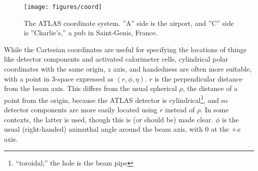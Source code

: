 \begin{figure}[!htbp]\captionsetup{justification=centering}
  \centering
  \texttt{[image: figures/coord]}
  \caption{The  ATLAS coordinate system.  ''A'' side is the airport, and ''C'' side is ''Charlie's,'' a pub in Saint-Genis, France.}
  \label{fig:acoord}
\end{figure}

While the Cartesian coordinates are useful for specifying the locations of things like detector components and activated calorimeter cells, cylindrical polar coordinates with the same origin, $z$ axis, and handedness are often more suitable, with a point in 3-space expressed as $\left(r,\phi,\eta\right)$.  $r$ is the perpendicular distance from the beam axis.  This differs from the usual spherical $\rho$, the distance of a point from the origin, because the ATLAS detector is cylindrical\footnote{``toroidal;'' the hole is the beam pipe}, and so detector components are more easily located using $r$ instead of $\rho$.  In some contexts, the latter is used, though this is (or should be) made clear.  $\phi$ is the usual (right-handed) azimuthal angle around the beam axis, with 0 at the $+x$ axis.

